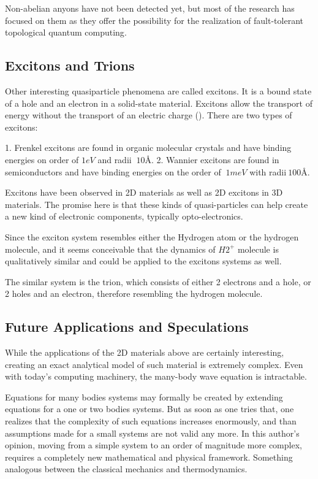 Non-abelian anyons have not been detected yet, but most of the research has focused on them as they offer the possibility 
for the realization of fault-tolerant topological quantum computing\cite{AnyonsTqc}. 

\subsection*{Excitons and Trions}
Other interesting quasiparticle phenomena are called excitons\cite{Excitons2D1}. It is a bound state of a hole and an electron in a solid-state material. Excitons allow the transport of energy without the transport of an electric charge (). There are two types of excitons: 

1. Frenkel excitons are found in organic molecular crystals\cite{Excitons3} and have binding energies on
order of $ 1eV $ and radii $ ~ 10\text{\AA} $.  
2. Wannier excitons are found in semiconductors\cite{Excitons2} and have binding energies on the order of $ ~1 meV $ with radii$ ~100\text{\AA}. $


Excitons have been observed in 2D materials\cite{Excitons2D2} as
well as 2D excitons in 3D materials. The promise here is that these kinds of quasi-particles can help create a new kind of electronic components, typically opto-electronics.

Since the exciton system resembles either the Hydrogen atom or the hydrogen molecule, and it seems conceivable that the dynamics of  $ H2^{+} $ molecule is qualitatively similar and could be applied to the excitons systems as well.

The similar system is the trion, which consists of either 2 electrons and a hole, or 2 holes and an electron, therefore resembling the hydrogen molecule. 

\subsection*{Future Applications and Speculations}

While the applications of the 2D materials above are certainly interesting, creating an exact analytical  model of such material is extremely complex. Even with today's computing machinery, the many-body wave equation is intractable.  

Equations for many bodies systems may formally be created by extending equations for a one or two bodies systems. But as soon as one tries that, one realizes that the complexity of such equations increases enormously, and than assumptions  made for a small systems are not valid any more. In this author's opinion, moving from a simple system to an order of magnitude more complex, requires a completely new mathematical and physical framework. Something analogous between the classical mechanics and thermodynamics.

